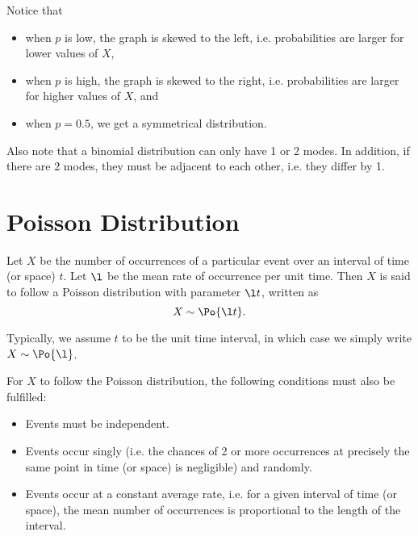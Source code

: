 Notice that
\begin{itemize}
    \item when $p$ is low, the graph is skewed to the left, i.e. probabilities are larger for lower values of $X$,
    \item when $p$ is high, the graph is skewed to the right, i.e. probabilities are larger for higher values of $X$, and
    \item when $p = 0.5$, we get a symmetrical distribution.
\end{itemize}

Also note that a binomial distribution can only have 1 or 2 modes. In addition, if there are 2 modes, they must be adjacent to each other, i.e. they differ by 1.

\section{Poisson Distribution}

\begin{definition}
    Let $X$ be the number of occurrences of a particular event over an interval of time (or space) $t$. Let $\l$ be the mean rate of occurrence per unit time. Then $X$ is said to follow a Poisson distribution with parameter $\l t$, written as \[X \sim \Po{\l t}.\]
\end{definition}
\begin{remark}
    Typically, we assume $t$ to be the unit time interval, in which case we simply write $X \sim \Po{\l}$.
\end{remark}

For $X$ to follow the Poisson distribution, the following conditions must also be fulfilled:

\begin{condition}\label{con:Poisson}
    \phantom{.}
    \begin{itemize}
        \item Events must be independent.
        \item Events occur singly (i.e. the chances of 2 or more occurrences at precisely the same point in time (or space) is negligible) and randomly.
        \item Events occur at a constant average rate, i.e. for a given interval of time (or space), the mean number of occurrences is proportional to the length of the interval.
    \end{itemize}
\end{condition}

